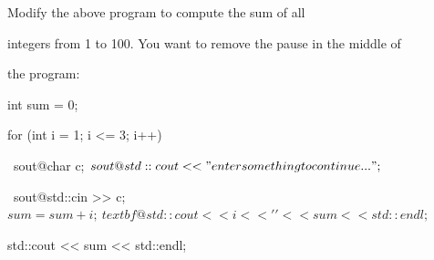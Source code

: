  Modify the above program to compute the sum of all

integers from 1 to 100. You want to remove the pause in the middle of

the program:

\begin{console}[commandchars=\~\@\$]

int sum = 0;

for (int i = 1; i <= 3; i++)

{   

    ~sout@char c;$

    ~sout@std::cout << "enter something to continue ...";$

    ~sout@std::cin >> c;$

    

    sum = sum + i;

    ~textbf@std::cout << i << ' ' << sum << std::endl;$

}

std::cout << sum << std::endl;

\end{console}

